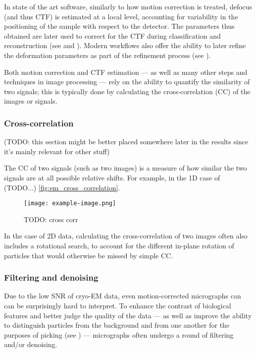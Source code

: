 In state of the art software, similarly to how motion correction is treated, defocus (and thus CTF) is estimated at a local level, accounting for variability in the positioning of the sample with respect to the detector.
The parameters thus obtained are later used to correct for the CTF during classification and reconstruction (see  and ).
Modern workflows also offer the ability to later refine the deformation parameters as part of the refinement process (see ).

Both motion correction and CTF estimation --- as well as many other steps and techniques in image processing --- rely on the ability to quantify the similarity of two signals; this is typically done by calculating the cross-correlation (CC) of the images or signals.

\subsubsection{Cross-correlation}\label{em_cross_correlation}

(TODO: this section might be better placed somewhere later in the results since it's mainly relevant for other stuff)

The CC of two signals (such as two images) is a measure of how similar the two signals are at all possible relative shifts. For example, in the 1D case of (TODO...) \autoref{fig:em_cross_correlation}.

\begin{figure}[ht]
    \centering
    \texttt{[image: example-image.png]}
    \caption{TODO: cross corr}
    \label{fig:em_cross_correlation}
\end{figure}

In the case of 2D data, calculating the cross-correlation of two images often also includes a rotational search, to account for the different in-plane rotation of particles that would otherwise be missed by simple CC.

\subsubsection{Filtering and denoising}\label{em_filtering_and_denoising}

Due to the low SNR of cryo-EM data, even motion-corrected micrographs can can be surprisingly hard to interpret.
To enhance the contrast of biological features and better judge the quality of the data --- as well as improve the ability to distinguish particles from the background and from one another for the purposes of picking (see ) --- micrographs often undergo a round of filtering and/or denoising.

